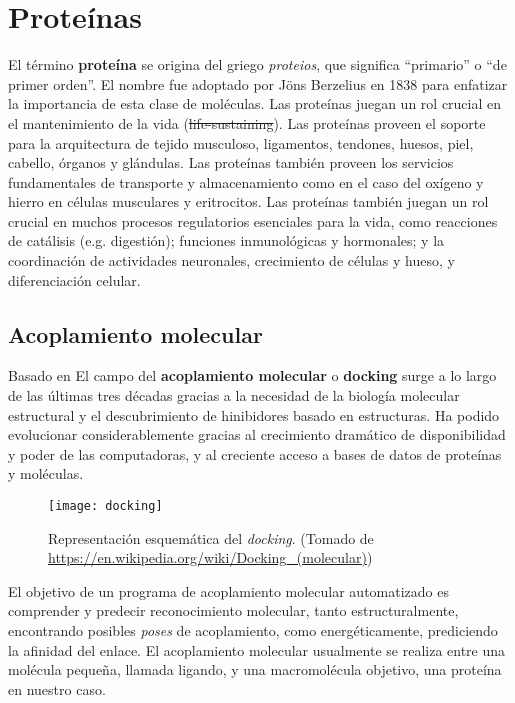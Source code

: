 \section{Proteínas}
\cite{tamar}
El término \textbf{proteína} se origina del griego \textit{proteios},
que significa ``primario'' o ``de primer orden''. El nombre fue
adoptado por Jöns Berzelius en 1838 para enfatizar la importancia de
esta clase de moléculas. Las proteínas juegan un rol crucial en el
mantenimiento de la vida (\sout{life-sustaining}). Las proteínas proveen el
soporte para la arquitectura de tejido musculoso, ligamentos, tendones, huesos,
piel, cabello, órganos y glándulas. Las proteínas también proveen los servicios
fundamentales de transporte y almacenamiento como en el caso del oxígeno y
hierro en células musculares y eritrocitos. Las proteínas también juegan un rol
crucial en muchos procesos regulatorios esenciales para la vida, como reacciones
de catálisis (e.g. digestión); funciones inmunológicas y hormonales; y la
coordinación de actividades neuronales, crecimiento de células y hueso, y
diferenciación celular.


\subsection{Acoplamiento molecular}
Basado en \cite{kukol} El campo del \textbf{acoplamiento molecular} o
\textbf{docking} surge a lo largo de las últimas tres décadas gracias a la
necesidad de la biología molecular estructural y el descubrimiento de
hinibidores basado en estructuras. Ha podido evolucionar considerablemente
gracias al crecimiento dramático de disponibilidad y poder de las computadoras,
y al creciente acceso a bases de datos de proteínas y moléculas.

\begin{figure}[H]
  \texttt{[image: docking]} \centering
  \caption{Representación esquemática del \textit{docking}.  (Tomado de
    \url{https://en.wikipedia.org/wiki/Docking_(molecular)})}
\end{figure}

El objetivo de un programa de acoplamiento molecular automatizado es comprender
y predecir reconocimiento molecular, tanto estructuralmente, encontrando
posibles \textit{poses} de acoplamiento, como energéticamente, prediciendo la
afinidad del enlace. El acoplamiento molecular usualmente se realiza entre una
molécula pequeña, llamada ligando, y una macromolécula objetivo, una proteína en
nuestro caso.

